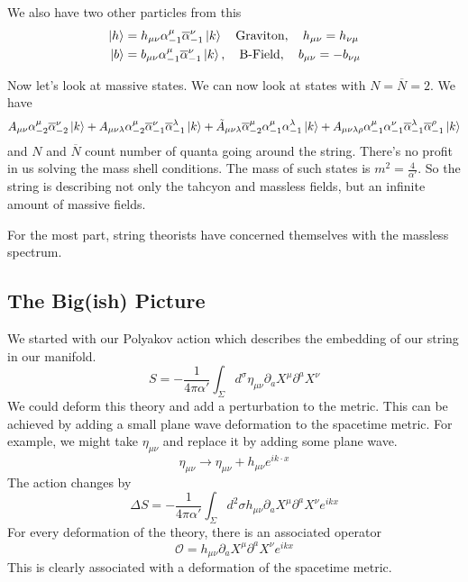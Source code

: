 \documentclass[11pt, oneside]{article}   	%
\theoremstyle{slanted}
\begin{document}
We also have two other particles from this 
\begin{align*}
	\ket{ h }  &=  h _{ \mu \nu  } \alpha _{ - 1 } ^ \mu \overline{ \alpha }_{ - 1 } ^ \nu 
	\ket{ k } \quad \text{Graviton}, \quad h _{ \mu \nu }  = h _{ \nu \mu  } \\
	\ket{ b } &=  b _{ \mu \nu } \alpha _{ - 1 } ^ \mu \overline{ \alpha } _{ - 1 }^ \nu 
	\ket{ k }, \quad \text{B-Field}, \quad b _{ \mu \nu }  = - b _{ \nu \mu } \\
\end{align*}

Now let's look at massive states. 
We can now look at states with $ N = \overline{ N }  = 2 $. 
We have 
\[
 A _{ \mu \nu } \alpha _{ - 2 } ^ \mu \overline{ \alpha } _{ - 2 } ^ \nu \ket{ k } 
 + A_{ \mu \nu \lambda } \alpha _{ - 2 } ^ \mu \overline{ \alpha } _{ - 1 } ^ \nu 
 \overline{ \alpha } _{ -  1 } ^ \lambda \ket{ k } + 
 \tilde{ A }_{ \mu \nu \lambda } \overline{\alpha } _{ - 2 } ^ \mu \alpha _{ - 1 }^ \mu  \alpha _{ - 1}  
 ^ \lambda \ket{ k } + A _{ \mu \nu \lambda \rho } \alpha _{ - 1 } ^ \mu \alpha _{ -1 } ^ \nu 
 \overline{ \alpha  } _{ - 1 } ^ \lambda \overline{ \alpha } _{ -1 } ^ \rho \ket{ k } 
\] and $ N $ and $ \overline{ N  } $ count 
number of quanta going around the string. 
There's no profit 
in us solving the mass shell conditions. 
The mass of such states is $ m ^ 2  = \frac{4}{\alpha ' }  $. 
So the string is describing not only the tahcyon 
and massless fields, but an infinite amount of massive 
fields.

For the most part, string theorists 
have concerned themselves with the massless spectrum. 

\subsection{The Big(ish) Picture}
We started with our Polyakov action 
which describes the embedding of our string in our manifold. 
\[
 S  = -\frac{1}{4 \pi \alpha ' } \int_{ \Sigma } d ^ \sigma \eta _{ \mu \nu } \partial  _ a X ^ \mu 
 \partial  ^ a X ^ \nu 
\] We could deform this 
theory and add a perturbation to the metric. 
This can be achieved by adding a 
small plane wave deformation to the spacetime 
metric.
For example, we might take 
$ \eta _{ \mu \nu } $ and replace it 
by adding some plane wave. 
\[
 \eta _{ \mu \nu } \to \eta _{ \mu \nu } + h _{ \mu \nu  } e ^{ i k \cdot  x } 
\] 
The action changes by 
\[
 \Delta S  =  - \frac{1}{4 \pi \alpha ' } \int_{ \Sigma } d ^ 2 \sigma 
 h _{ \mu \nu } \partial  _ a X ^ \mu \partial  ^ a X ^ \nu e ^{ ikx } 
\] 
For every deformation of the theory, 
there is an associated operator 
\[
 \mathcal{ O }  = h _{ \mu \nu } \partial  _ a X ^ \mu \partial  ^ a X ^ \nu e ^{ ikx  }
\] This is clearly associated with a 
deformation of the spacetime metric. 
\end{document}
